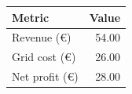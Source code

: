 \begin{tabular}{lr}
\toprule
Metric & Value \\
\midrule
Revenue (€) & 54.00 \\
Grid cost (€) & 26.00 \\
Net profit (€) & 28.00 \\
\bottomrule
\end{tabular}